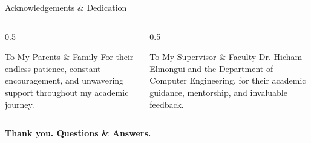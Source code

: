 \documentclass[10pt]{beamer}
\begin{document}
\begin{frame}{Acknowledgements \& Dedication}
    \begin{columns}
        \begin{column}{0.5\textwidth}
            \begin{block}{To My Parents \& Family}
                \small
                For their endless patience, constant encouragement, and unwavering support throughout my academic journey.
            \end{block}
        \end{column}
        \begin{column}{0.5\textwidth}
            \begin{block}{To My Supervisor \& Faculty}
                \small
                Dr. Hicham Elmongui and the Department of Computer Engineering, for their academic guidance, mentorship, and invaluable feedback.
            \end{block}
        \end{column}
    \end{columns}
    \vspace{0.4in}
    \begin{center}
        \textbf{\large Thank you. Questions \& Answers.}
    \end{center}
\end{frame}
\end{document}
